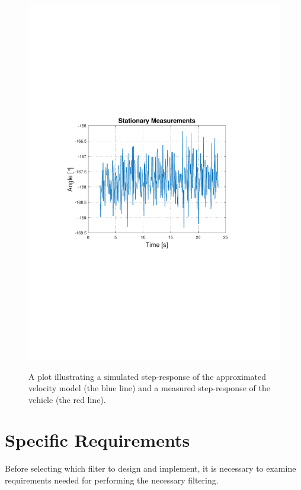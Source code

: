 \begin{figure}[H]
  \centering
  {
    \includegraphics[width=1.1\textwidth]{figures/StationaryMeasurementsMagnato.pdf}
  }
  \caption{A plot illustrating a simulated step-response of the approximated velocity model (the blue line) and a measured step-response of the vehicle (the red line).}
  \label{fig:StationaryMeasurementsMagnato}
\end{figure}


\section{Specific Requirements}
Before selecting which filter to design and implement, it is necessary to examine requirements needed for performing the necessary filtering.

